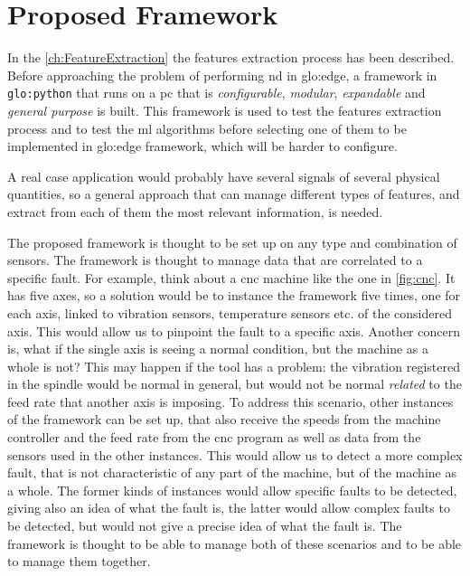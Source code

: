 \chapter{Proposed Framework}
\label{ch:Framework}

In the \autoref{ch:FeatureExtraction} the features extraction process has been described. Before approaching the problem of performing \gls{nd} in \gls{glo:edge}, a framework in \texttt{\gls{glo:python}} that runs on a \gls{pc} that is \emph{configurable}, \emph{modular}, \emph{expandable} and \emph{general purpose} is built. This framework is used to test the features extraction process and to test the \gls{ml} algorithms before selecting one of them to be implemented in \gls{glo:edge} framework, which will be harder to configure.

A real case application would probably have several signals of several physical quantities, so a general approach that can manage different types of features, and extract from each of them the most relevant information, is needed.

The proposed framework is thought to be set up on any type and combination of sensors. The framework is thought to manage data that are correlated to a specific fault. For example, think about a \gls{cnc} machine like the one in \autoref{fig:cnc}. It has five axes, so a solution would be to instance the framework five times, one for each axis, linked to vibration sensors, temperature sensors etc. of the considered axis. This would allow us to pinpoint the fault to a specific axis. Another concern is, what if the single axis is seeing a normal condition, but the machine as a whole is not? This may happen if the tool has a problem: the vibration registered in the spindle would be normal in general, but would not be normal \emph{related} to the feed rate that another axis is imposing. To address this scenario, other instances of the framework can be set up, that also receive the speeds from the machine controller and the feed rate from the \gls{cnc} program as well as data from the sensors used in the other instances. This would allow us to detect a more complex fault, that is not characteristic of any part of the machine, but of the machine as a whole. The former kinds of instances would allow specific faults to be detected, giving also an idea of what the fault is, the latter would allow complex faults to be detected, but would not give a precise idea of what the fault is. The framework is thought to be able to manage both of these scenarios and to be able to manage them together.

